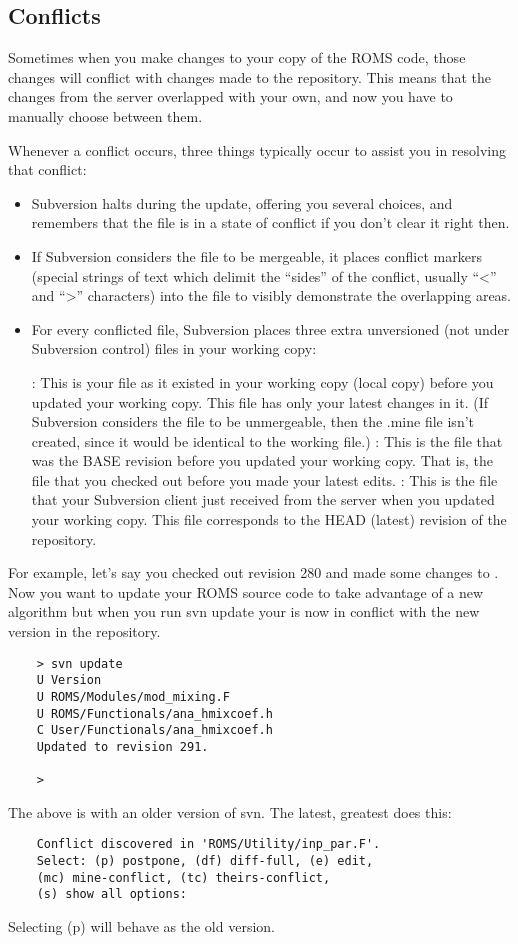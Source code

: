 \subsection{Conflicts}
Sometimes when you make changes to your copy of the ROMS code, those changes
will conflict with changes made to the repository. This means that the
changes from the server overlapped with your own, and now you have to
manually choose between them.

Whenever a conflict occurs, three things typically occur to assist you in
resolving that conflict:
\begin{itemize}
        \item Subversion halts during the update, offering you several choices,
and remembers that the file is in a state of conflict if you don't clear it
right then.
        \item If Subversion considers the file to be mergeable, it places
conflict markers (special strings of text which delimit the “sides” of the
conflict, usually ``<'' and ``>'' characters) into the file to visibly
demonstrate the overlapping areas.
        \item For every conflicted file, Subversion places three extra
unversioned (not under Subversion control) files in your working copy: 
\begin{itemize}
            : This is your file as it existed
      in your working copy (local copy) before you updated your working
      copy. This file has only your latest changes in it. (If Subversion
      considers the file to be unmergeable, then the .mine file isn't
      created, since it would be identical to the working file.)
            : This is the file that was the
      BASE revision before you updated your working copy. That is,
      the file that you checked out before you made your latest edits.
            : This is the file that your
      Subversion client just received from the server when you updated
      your working copy. This file corresponds to the HEAD (latest)
      revision of the repository.
  \end{itemize}
\end{itemize}
For example, let's say you checked out revision 280 and made some changes
to . Now you want to update your
ROMS source code to take advantage of a new algorithm but when you run
svn update your  is now in conflict with the new
version in the repository.
\begin{verbatim}
    > svn update
    U Version
    U ROMS/Modules/mod_mixing.F
    U ROMS/Functionals/ana_hmixcoef.h
    C User/Functionals/ana_hmixcoef.h
    Updated to revision 291.

    >
\end{verbatim}
The above is with an older version of svn. The latest, greatest does this:
\begin{verbatim}
    Conflict discovered in 'ROMS/Utility/inp_par.F'.
    Select: (p) postpone, (df) diff-full, (e) edit,
    (mc) mine-conflict, (tc) theirs-conflict,
    (s) show all options:
\end{verbatim}
Selecting (p) will behave as the old version.

